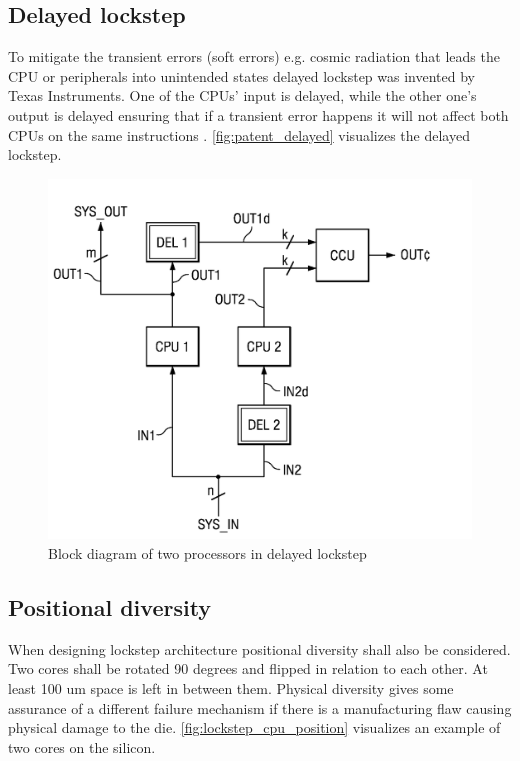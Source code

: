 \subsection{Delayed lockstep}
 
To mitigate the transient errors (soft errors) e.g. cosmic radiation that leads the CPU or peripherals into unintended states delayed lockstep was invented by Texas Instruments. One of the CPUs' input is delayed, while the other one's output is delayed ensuring that if a transient error happens it will not affect both CPUs on the same instructions \citep{patent_delayed_lockstep}. \autoref{fig:patent_delayed} visualizes the delayed lockstep.

\begin{figure}[H]

      \centering
      \includegraphics[width=0.8\linewidth]{images/patent_delayed.png}
      \caption{Block diagram of two processors in delayed lockstep \citep{patent_delayed_lockstep}}
      \label{fig:patent_delayed}
    
\end{figure}

\subsection{Positional diversity}

When designing lockstep architecture positional diversity shall also be considered. Two cores shall be rotated 90 degrees and flipped in relation to each other. At least 100 um space is left in between them. Physical diversity gives some assurance of a different failure mechanism if
there is a manufacturing flaw causing physical damage to the die. \autoref{fig:lockstep_cpu_position} visualizes an example of two cores on the silicon.

